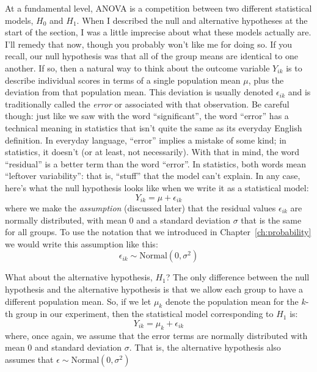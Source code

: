 At a fundamental level, ANOVA is a competition between two different statistical models, $H_0$ and $H_1$. When I described the null and alternative hypotheses at the start of the section, I was a little imprecise about what these models actually are. I'll remedy that now, though you probably won't like me for doing so. If you recall, our null hypothesis was that all of the group means are identical to one another. If so, then a natural way to think about the outcome variable $Y_{ik}$ is to describe individual scores in terms of a single population mean $\mu$, plus the deviation from that population mean. This deviation is usually denoted $\epsilon_{ik}$ and is traditionally called the {\it error} or  associated with that observation. Be careful though: just like we saw with the word ``significant'', the word ``error'' has a technical meaning in statistics that isn't quite the same as its everyday English definition. In everyday language, ``error'' implies a mistake of some kind; in statistics, it doesn't (or at least, not necessarily). With that in mind, the word ``residual'' is a better term than the word ``error''. In statistics, both words mean ``leftover variability'': that is, ``stuff'' that the model can't explain. In any case, here's what the null hypothesis looks like when we write it as a statistical model:
$$
Y_{ik} = \mu + \epsilon_{ik}
$$
where we make the {\it assumption} (discussed later) that the residual values $\epsilon_{ik}$ are normally distributed, with mean 0 and a standard deviation $\sigma$ that is the same for all groups. To use the notation that we introduced in Chapter~\ref{ch:probability} we would write this assumption like this:
$$
\epsilon_{ik} \sim \mbox{Normal}(0, \sigma^2)
$$

What about the alternative hypothesis, $H_1$? The only difference between the null hypothesis and the alternative hypothesis is that we allow each group to have a different population mean. So, if we let $\mu_k$ denote the population mean for the $k$-th group in our experiment, then the statistical model corresponding to $H_1$ is:
$$
Y_{ik} = \mu_k + \epsilon_{ik}
$$
where, once again, we assume that the error terms are normally distributed with mean 0 and standard deviation $\sigma$. That is, the alternative hypothesis also assumes that 
$
\epsilon \sim \mbox{Normal}(0, \sigma^2)
$

